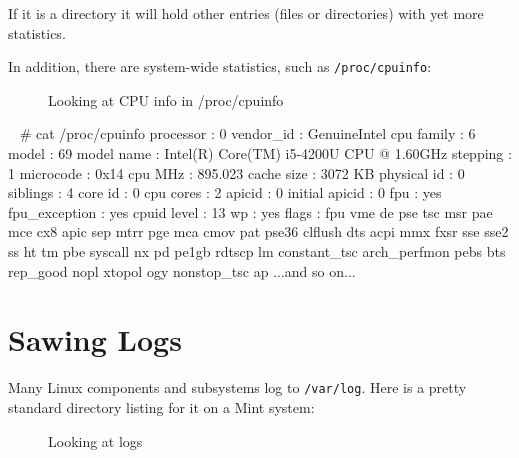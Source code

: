 \documentclass[10pt,american,]{book}
\newenvironment{Shaded}{\begin{snugshade}}{\end{snugshade}}
\newcommand{\KeywordTok}[1]{\textcolor[rgb]{0.13,0.29,0.53}{\textbf{{#1}}}}
\newcommand{\CommentTok}[1]{\textcolor[rgb]{0.56,0.35,0.01}{\textit{{#1}}}}
\newcommand{\NormalTok}[1]{{#1}}
\numberwithin{figure}{chapter}
\DeclareRobustCommand{\drcap}[1]{\begin{figure}[H]\caption{#1}\end{figure}}
\renewcommand{\KeywordTok}[1]{{#1}}
\renewcommand{\CommentTok}[1]{{#1}}
\renewcommand{\NormalTok}[1]{{#1}}
\begin{document}
If it is a directory it will hold other entries (files or directories)
with yet more statistics.

In addition, there are system-wide statistics, such as
\texttt{/proc/cpuinfo}:

\drcap{Looking at CPU info in /proc/cpuinfo}

\begin{Shaded}
\begin{Highlighting}[]
\KeywordTok{~} \CommentTok{# cat /proc/cpuinfo }
\KeywordTok{processor}   \NormalTok{: 0}
\KeywordTok{vendor_id}   \NormalTok{: GenuineIntel}
\KeywordTok{cpu} \NormalTok{family  : 6}
\KeywordTok{model}       \NormalTok{: 69}
\KeywordTok{model} \NormalTok{name  : Intel(R) }\KeywordTok{Core}\NormalTok{(TM) }\KeywordTok{i5-4200U} \NormalTok{CPU @ 1.60GHz}
\KeywordTok{stepping}    \NormalTok{: 1}
\KeywordTok{microcode}   \NormalTok{: 0x14}
\KeywordTok{cpu} \NormalTok{MHz     : 895.023}
\KeywordTok{cache} \NormalTok{size  : 3072 KB}
\KeywordTok{physical} \NormalTok{id : 0}
\KeywordTok{siblings}    \NormalTok{: 4}
\KeywordTok{core} \NormalTok{id     : 0}
\KeywordTok{cpu} \NormalTok{cores   : 2}
\KeywordTok{apicid}      \NormalTok{: 0}
\KeywordTok{initial} \NormalTok{apicid  : 0}
\KeywordTok{fpu}     \NormalTok{: yes}
\KeywordTok{fpu_exception}   \NormalTok{: yes}
\KeywordTok{cpuid} \NormalTok{level : 13}
\KeywordTok{wp}      \NormalTok{: yes}
\KeywordTok{flags}       \NormalTok{: fpu vme de pse tsc msr pae mce cx8 apic sep mtrr pge mca cmov }
\KeywordTok{pat} \NormalTok{pse36 clflush dts acpi mmx fxsr sse sse2 ss ht tm pbe syscall nx pd}
\KeywordTok{pe1gb} \NormalTok{rdtscp lm constant_tsc arch_perfmon pebs bts rep_good nopl xtopol}
\KeywordTok{ogy} \NormalTok{nonstop_tsc ap}
\KeywordTok{...and} \NormalTok{so on...}
\end{Highlighting}
\end{Shaded}

\section*{Sawing Logs}\label{sawing-logs}

Many Linux components and subsystems log to \texttt{/var/log}. Here is a
pretty standard directory listing for it on a Mint system:

\drcap{Looking at logs}
\end{document}

